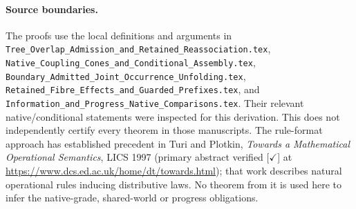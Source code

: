 \documentclass[11pt]{article}
\begin{document}
\paragraph{Source boundaries.} The proofs use the local definitions and arguments in \texttt{Tree\_Overlap\_Admission\_and\_Retained\_Reassociation.tex}, \texttt{Native\_Coupling\_Cones\_and\_Conditional\_Assembly.tex}, \texttt{Boundary\_Admitted\_Joint\_Occurrence\_Unfolding.tex}, \texttt{Retained\_Fibre\_Effects\_and\_Guarded\_Prefixes.tex}, and \texttt{Information\_and\_Progress\_Native\_Comparisons.tex}. Their relevant native/conditional statements were inspected for this derivation. This does not independently certify every theorem in those manuscripts. The rule-format approach has established precedent in Turi and Plotkin, \emph{Towards a Mathematical Operational Semantics}, LICS 1997 (primary abstract verified [\(\checkmark\)] at \url{https://www.dcs.ed.ac.uk/home/dt/towards.html}); that work describes natural operational rules inducing distributive laws. No theorem from it is used here to infer the native-grade, shared-world or progress obligations.
\end{document}
